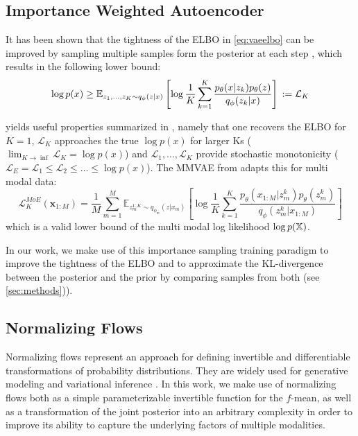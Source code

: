\subsection{Importance Weighted Autoencoder}
It has been shown that the tightness of the ELBO in \cref{eq:vaeelbo} can be improved by sampling multiple samples form the posterior at each step \parencite{burda_importance_2016}, which results in the following lower bound:
\begin{equation}
    \label{eq:iwelbo}
    \log p(x) \geq \mathbb{E}_{z_1,\ldots,z_K \sim q_{\phi}(z|x)}\left[ \log \frac{1}{K} \sum ^K _{k=1} \frac{p_{\theta}(x|z_k)p_{\theta}(z)}{q_{\phi}(z_k| x)} \right]\\
    := \mathcal{L}_K
\end{equation}

 yields useful properties summarized in \parencite{nowozin_debiasing_2018}, namely that one recovers the ELBO for $K=1$, $\mathcal{L}_K$ approaches the true $\log p(x)$ for larger Ks ($\lim _{K \rightarrow \inf} \mathcal{L}_K = \log p(x)$) and $\mathcal{L}_1, \ldots, \mathcal{L}_K$ provide stochastic monotonicity ($\mathcal{L}_E = \mathcal{L}_1 \leq \mathcal{L}_2 \leq \ldots \leq \log p(x)$).
The MMVAE from \parencite{shi2019variational} adapts this for multi modal data:
\begin{equation}
    \label{eq:iwelbommvae}
    \mathcal{L}^{MoE}_K(\textbf{x}_{1:M}) =
    \frac{1}{M} \sum _{m=1} ^M \mathbb{E}_{z_m^{1:K} \sim q_{\phi_m}(z|x_m)}\left[ \log \frac{1}{K} \sum ^K _{k=1} \frac{p_{\theta}(x_{1:M}|z_m^k)p_{\theta}(z^k_m)}{q_{\phi}(z_m^k| x_{1:M})} \right]
\end{equation}
which is a valid lower bound of the multi modal log likelihood $\log p(\mathbb{X})$.

In our work, we make use of this importance sampling training paradigm to improve the tightness of the ELBO and to approximate the KL-divergence between the posterior and the prior by comparing samples from both (see \cref{sec:methods})).

\subsection{Normalizing Flows}
Normalizing flows \parencite{papamakarios_normalizing_2019} represent an approach for defining invertible and differentiable transformations of probability distributions.
They are widely used for generative modeling \citep[\textbf{GLOW}, \textbf{Real NVP}]{kingma_glow_2018, dinh_density_2017} and variational inference \parencite{rezende_variational_2016, berg_sylvester_2019}.
In this work, we make use of normalizing flows both as a simple parameterizable invertible function for the $f$-mean, as well as a transformation of the joint posterior into an arbitrary complexity in order to improve its ability to capture the underlying factors of multiple modalities.

